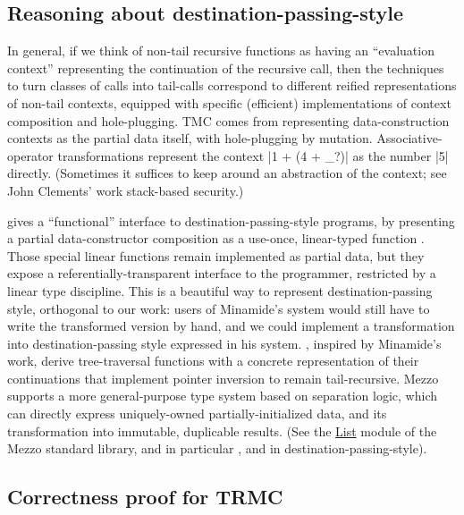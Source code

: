 \subsection{Reasoning about destination-passing-style}

In general, if we think of non-tail recursive functions as having an ``evaluation context'' representing the continuation of the recursive call, then the techniques to turn classes of calls into tail-calls correspond to different reified representations of non-tail contexts, equipped with specific (efficient) implementations of context composition and hole-plugging.
TMC comes from representing data-construction contexts as the partial data itself, with hole-plugging by mutation.
Associative-operator transformations represent the context \ocaml|1 + (4 + _?)| as the number \ocaml|5| directly.
(Sometimes it suffices to keep around an abstraction of the context; see John Clements' work stack-based security.)

\citet*{minamide-98} gives a ``functional'' interface to destination-passing-style programs, by presenting a partial data-constructor composition  as a use-once, linear-typed function .
Those special linear functions remain implemented as partial data, but they expose a referentially-transparent interface to the programmer, restricted by a linear type discipline.
This is a beautiful way to represent destination-passing style, orthogonal to our work: users of Minamide's system would still have to write the transformed version by hand, and we could implement a transformation into destination-passing style expressed in his system.
\citet*{sobel-friedman-98}, inspired by Minamide's work, derive tree-traversal functions with a concrete representation of their continuations that implement pointer inversion to remain tail-recursive.
Mezzo~\citep*{mezzo-2016} supports a more general-purpose type system based on separation logic, which can directly express uniquely-owned partially-initialized data, and its transformation into immutable, duplicable results.
(See the \href{https://protz.github.io/mezzo/code_samples/list.mz.html}{List} module of the Mezzo standard library, and in particular ,  and  in destination-passing-style).

\subsection{Correctness proof for TRMC}

